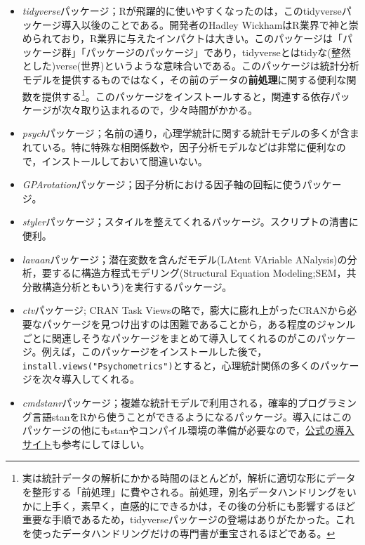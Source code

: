 \documentclass[
  a4paper,
]{ltjsbook}
\providecommand{\tightlist}{%
  \setlength{\itemsep}{0pt}\setlength{\parskip}{0pt}}\usepackage{longtable,booktabs,array}
\begin{document}
\begin{itemize}
\tightlist
\item
  \emph{tidyverse}パッケージ\autocite{tidyverse}；Rが飛躍的に使いやすくなったのは，このtidyverseパッケージ導入以後のことである。開発者のHadley
  WickhamはR業界で神と崇められており，R業界に与えたインパクトは大きい。このパッケージは「パッケージ群」「パッケージのパッケージ」であり，tidyverseとはtidyな(整然とした)verse(世界)というような意味合いである。このパッケージは統計分析モデルを提供するものではなく，その前のデータの\textbf{前処理}に関する便利な関数を提供する\footnote{実は統計データの解析にかかる時間のほとんどが，解析に適切な形にデータを整形する「前処理」に費やされる。前処理，別名データハンドリングをいかに上手く，素早く，直感的にできるかは，その後の分析にも影響するほど重要な手順であるため，tidyverseパッケージの登場はありがたかった。これを使ったデータハンドリングだけの専門書\autocite{Kinosady2021}が重宝されるほどである。}。このパッケージをインストールすると，関連する依存パッケージが次々取り込まれるので，少々時間がかかる。
\item
  \emph{psych}パッケージ\autocite{psych}；名前の通り，心理学統計に関する統計モデルの多くが含まれている。特に特殊な相関係数や，因子分析モデルなどは非常に便利なので，インストールしておいて間違いない。
\item
  \emph{GPArotation}パッケージ\autocite{GPArotation}；因子分析における因子軸の回転に使うパッケージ。
\item
  \emph{styler}パッケージ；スタイルを整えてくれるパッケージ。スクリプトの清書に便利。
\item
  \emph{lavaan}パッケージ\autocite{lavaan}；潜在変数を含んだモデル(LAtent
  VAriable ANalysis)の分析，要するに構造方程式モデリング(Structural
  Equation Modeling;SEM，共分散構造分析ともいう)を実行するパッケージ。
\item
  \emph{ctv}パッケージ\autocite{CTV}; CRAN Task
  Viewsの略で，膨大に膨れ上がったCRANから必要なパッケージを見つけ出すのは困難であることから，ある程度のジャンルごとに関連しそうなパッケージをまとめて導入してくれるのがこのパッケージ。例えば，このパッケージをインストールした後で，\texttt{install.views("Psychometrics")}とすると，心理統計関係の多くのパッケージを次々導入してくれる。
\item
  \emph{cmdstanr}パッケージ\autocite{cmdstanr}；複雑な統計モデルで利用される，確率的プログラミング言語stanをRから使うことができるようになるパッケージ。導入にはこのパッケージの他にもstanやコンパイル環境の準備が必要なので，\href{https://mc-stan.org/cmdstanr/articles/cmdstanr.html}{公式の導入サイト}も参考にしてほしい。
\end{itemize}
\end{document}
